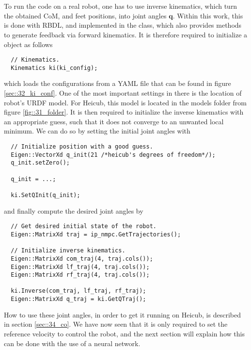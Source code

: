 \\
\\
To run the code on a real robot, one has to use inverse kinematics, which turn the obtained CoM, and feet positions, into joint angles $\bm{q}$. Within this work, this is done with RBDL, and implemented in the  class, which also provides methods to generate feedback via forward kinematics. It is therefore required to initialize a  object as follows
\begin{verbatim}
  // Kinematics.
  Kinematics ki(ki_config);
\end{verbatim}
which loads the configurations from a YAML file that can be found in figure \ref{sec::32_ki_conf}. One of the most important settings in there is the location of robot's URDF model. For Heicub, this model is located in the models folder from figure \ref{fig::31_folder}.  It is then required to initialize the inverse kinematics with an appropriate guess, such that it does not converge to an unwanted local minimum. We can do so by setting the initial joint angles with
\begin{verbatim}
  // Initialize position with a good guess.
  Eigen::VectorXd q_init(21 /*heicub's degrees of freedom*/);
  q_init.setZero();

  q_init = ...;

  ki.SetQInit(q_init);
\end{verbatim}
and finally compute the desired joint angles by
\begin{verbatim}
  // Get desired initial state of the robot.
  Eigen::MatrixXd traj = ip_nmpc.GetTrajectories();

  // Initialize inverse kinematics.
  Eigen::MatrixXd com_traj(4, traj.cols());     
  Eigen::MatrixXd lf_traj(4, traj.cols());  
  Eigen::MatrixXd rf_traj(4, traj.cols());

  ki.Inverse(com_traj, lf_traj, rf_traj);
  Eigen::MatrixXd q_traj = ki.GetQTraj();
\end{verbatim}
How to use these joint angles, in order to get it running on Heicub, is described in section \ref{sec::34_co}. We have now seen that it is only required to set the reference velocity to control the robot, and the next section will explain how this can be done with the use of a neural network.
\\
